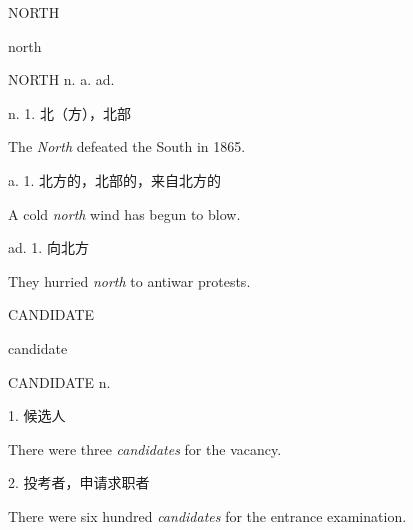 \begin{flashcard}{
NORTH

north
}
\begin{center}
NORTH n. a. ad. 
\end{center}
n. 1. 北（方），北部

The \textit{North} defeated the South in 1865.

a. 1. 北方的，北部的，来自北方的

A cold \textit{north} wind has begun to blow.

ad. 1. 向北方

They hurried \textit{north} to antiwar protests.

\end{flashcard}
\begin{flashcard}{
CANDIDATE

candidate
}
\begin{center}
CANDIDATE n. 
\end{center}
1. 候选人

There were three \textit{candidates} for the vacancy.

2. 投考者，申请求职者

There were six hundred \textit{candidates} for the entrance examination.

\end{flashcard}
